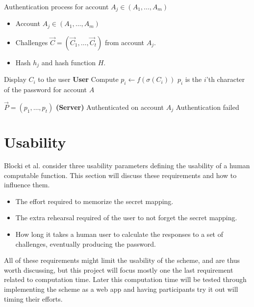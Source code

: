 \begin{algorithm}
    \caption{Authentication process for account $A_j \in (A_1,\dots,A_m)$}
    \begin{algorithmic}[1]
        \Require
            \Statex \begin{itemize}
                \item Account $A_j \in (A_1,\dots, A_m)$
                \item Challenges $\vec C = (\vec C_1,\dots,\vec C_t)$ from account $A_j$.
                \item Hash $h_j$ and hash function $H$.
            \end{itemize}

                \State Display $C_i$ to the user
                \State \textbf{User} Compute $p_i \leftarrow f(\sigma(C_i))$
                \State
                \Comment $p_i$ is the $i$'th character of the password for account $A$
            \EndFor

            \State $\vec P = (p_1,\dots,p_t)$
            \Comment \textbf{(Server)} 
                \State Authenticated on account $A_j$
            \Else 
                \State Authentication failed
            \EndIf

    \end{algorithmic}
    \label{auth-algo}
\end{algorithm}



\section{Usability}
Blocki et al. \cite{hcp-blocki} consider three usability parameters defining the usability of a human computable function. This section will discuss these requirements and how to influence them. 
\begin{itemize}
    \item The effort required to memorize the secret mapping.
    \item The extra rehearsal required of the user to not forget the secret mapping. 
    \item How long it takes a human user to calculate the responses to a set of challenges, eventually producing the password. 
\end{itemize}
All of these requirements might limit the usability of the scheme, and are thus worth discussing, but this project will focus mostly one the last requirement related to computation time. Later this computation time will be tested through implementing the scheme as a web app and having participants try it out will timing their efforts.

